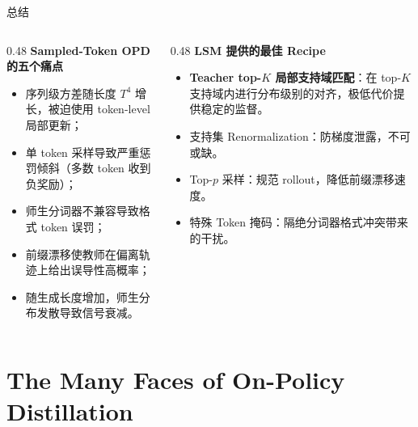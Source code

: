 \documentclass{beamer}
\begin{document}
\begin{frame}[t]{总结}
  \begin{columns}[T,onlytextwidth]
    \begin{column}{0.48\textwidth}
      \textbf{Sampled-Token OPD 的五个痛点}
      \begin{itemize}
        \item 序列级方差随长度 $T^4$ 增长，被迫使用 token-level 局部更新；
        \item 单 token 采样导致严重惩罚倾斜（多数 token 收到负奖励）；
        \item 师生分词器不兼容导致格式 token 误罚；
        \item 前缀漂移使教师在偏离轨迹上给出误导性高概率；
        \item 随生成长度增加，师生分布发散导致信号衰减。
      \end{itemize}
    \end{column}
    \begin{column}{0.48\textwidth}
      \textbf{LSM 提供的最佳 Recipe}
      \begin{itemize}
        \item \textbf{Teacher top-$K$ 局部支持域匹配}：在 top-$K$ 支持域内进行分布级别的对齐，极低代价提供稳定的监督。
        \item 支持集 Renormalization：防梯度泄露，不可或缺。
        \item Top-$p$ 采样：规范 rollout，降低前缀漂移速度。
        \item 特殊 Token 掩码：隔绝分词器格式冲突带来的干扰。
      \end{itemize}
    \end{column}
  \end{columns}
\end{frame}

\section{The Many Faces of On-Policy Distillation}
\end{document}
